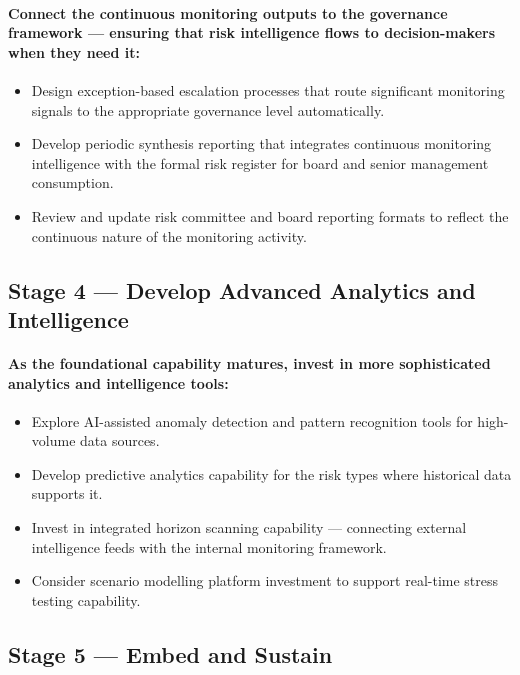\paragraph{Connect the continuous monitoring outputs to the governance framework — ensuring that risk intelligence flows to decision-makers when they need it:}
\begin{itemize}
  \item{Design exception-based escalation processes that route significant monitoring signals to the appropriate governance level automatically.}
  \item{Develop periodic synthesis reporting that integrates continuous monitoring intelligence with the formal risk register for board and senior management consumption.}
  \item{Review and update risk committee and board reporting formats to reflect the continuous nature of the monitoring activity.}
\end{itemize}

\subsection{Stage 4 — Develop Advanced Analytics and Intelligence}
\paragraph{As the foundational capability matures, invest in more sophisticated analytics and intelligence tools:}
\begin{itemize}
  \item{Explore AI-assisted anomaly detection and pattern recognition tools for high-volume data sources.}
  \item{Develop predictive analytics capability for the risk types where historical data supports it.}
  \item{Invest in integrated horizon scanning capability — connecting external intelligence feeds with the internal monitoring framework.}
  \item{Consider scenario modelling platform investment to support real-time stress testing capability.}
\end{itemize}

\subsection{Stage 5 — Embed and Sustain}
